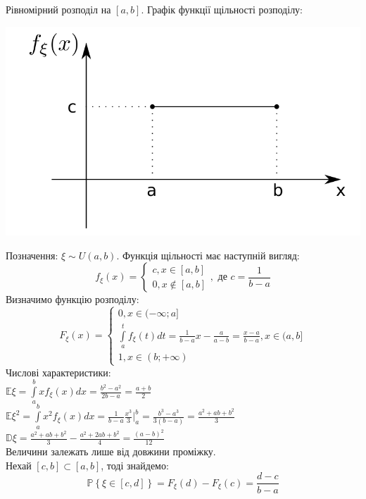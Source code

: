 \documentclass[14pt,a4paper]{scrartcl}
\theoremstyle{definition}
\theoremstyle{remark}
\theoremstyle{definition}
\theoremstyle{definition}
\begin{document}
Рівномірний розподіл на $[a,b]$. Графік функції щільності розподілу:\\
\begin{center} \includegraphics[scale=0.3]{images/2.png} \end{center}
Позначення: $\xi \sim U(a,b)$. Функція щільності має наступній вигляд:\\
$$
f_\xi (x) = \left\lbrace \begin{gathered}
 c, x \in [a,b] \\
 0, x \notin [a,b]
 \end{gathered} \right. , \text{ де } c = \frac{1}{b-a}
$$
Визначимо функцію розподілу: $$F_\xi (x) = \left\lbrace
\begin{gathered}
0, x \in (-\infty; a]\\
	\int\limits_{a}^{ t}{f_\xi (t) dt} = \frac{1}{b-a} x - \frac{a}{a-b}  = \frac{x-a}{b-a}, x \in (a,b] \\
1, x \in (b; + \infty)
\end{gathered} \right.   $$
Числові характеристики:\\
$ \mathbb{E} \xi  =   \int\limits_{a}^{ b}{ x  f_\xi (x) dx} = \frac{b^2 - a^2}{2b - a}  = \frac{a+b}{2} $ \\
$ \mathbb{E} \xi^2 =  \int\limits_{a}^{ b}{x^2 f_\xi (x) dx} = \frac{1}{b-a} \frac{x^3}{3} \Big|_a^b = \frac{b^3 - a^3}{3(b-a)} = \frac{a^2 + ab + b^2}{3}   $\\
$ \mathbb{D} \xi =  \frac{a^2 + ab + b^2}{3} - \frac{a^2 + 2ab + b^2}{ 4} = \frac{(a-b)^2}{12}  $\\
Величини залежать лише від довжини проміжку.\\ Нехай $[c,b] \subset [a,b]$, тоді знайдемо:
$$
\mathbb{P} \left\lbrace \xi \in [c,d] \right\rbrace = F_\xi(d) - F_\xi (c) = \frac{d-c}{b-a}
$$
\end{document}
